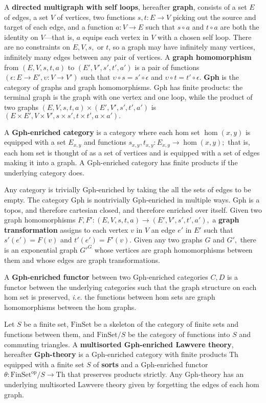 \documentclass[a4paper,UKenglish]{lipics-v2016}
\newcommand{\maps}{\colon}
\newcommand{\Th}{\mathrm{Th}}
\newcommand{\FinSet}{\mathrm{FinSet}}
\newcommand{\op}{\mathrm{op}}
\begin{document}
A {\bf directed multigraph with self loops}, hereafter {\bf graph}, consists of a set $E$ of edges, a set $V$ of vertices, two functions $s,t\maps E \to V$ picking out the source and target of each edge, and a function $a\maps V \to E$ such that $s\circ a$ and $t \circ a$ are both the identity on $V$---that is, $a$ equips each vertex in $V$ with a chosen self loop.  There are no constraints on $E, V, s,$ or $t$, so a graph may have infinitely many vertices, infinitely many edges between any pair of vertices.  A {\bf graph homomorphism} from $(E, V, s, t, a)$ to $(E', V', s', t', a')$ is a pair of functions $(\epsilon\maps E \to E', \upsilon\maps V \to V')$ such that $\upsilon\circ s = s' \circ \epsilon$ and $\upsilon\circ t = t' \circ \epsilon$.  {\bf Gph} is the category of graphs and graph homomorphisms.  Gph has finite products: the terminal graph is the graph with one vertex and one loop, while the product of two graphs $(E, V, s, t, a) \times (E', V', s', t', a')$ is $(E \times E', V \times V', s \times s', t\times t', a \times a').$

A {\bf Gph-enriched category} is a category where each hom set $\hom(x,y)$ is equipped with a set $E_{x,y}$ and functions $s_{x,y}, t_{x,y}\maps E_{x,y} \to \hom(x,y);$ that is, each hom set is thought of as a set of vertices and is equipped with a set of edges making it into a graph.  A Gph-enriched category has finite products if the underlying category does.

Any category is trivially Gph-enriched by taking the all the sets of edges to be empty.  The category Gph is nontrivially Gph-enriched in multiple ways.  Gph is a topos, and therefore cartesian closed, and therefore enriched over itself.  Given two graph homomorphisms $F, F'\maps (E, V, s, t, a) \to (E', V', s', t', a'),$ a {\bf graph transformation} assigns to each vertex $v$ in $V$ an edge $e'$ in $E'$ such that $s'(e') = F(v)$ and $t'(e') = F'(v).$  Given any two graphs $G$ and $G',$ there is an exponential graph $G'^G$ whose vertices are graph homomorphisms between them and whose edges are graph transformations.

A {\bf Gph-enriched functor} between two Gph-enriched categories $C, D$ is a functor between the underlying categories such that the graph structure on each hom set is preserved, {\em i.e.} the functions between hom sets are graph homomorphisms between the hom graphs.

Let $S$ be a finite set, $\FinSet$ be a skeleton of the category of finite sets and functions between them, and $\FinSet/S$ be the category of functions into $S$ and commuting triangles.  A {\bf multisorted Gph-enriched Lawvere theory}, hereafter {\bf Gph-theory} is a Gph-enriched category with finite products Th equipped with a finite set $S$ of {\bf sorts} and a Gph-enriched functor $\theta\maps \FinSet^{\op}/S \to \Th$ that preserves products strictly.  Any Gph-theory has an underlying multisorted Lawvere theory given by forgetting the edges of each hom graph.
\end{document}
